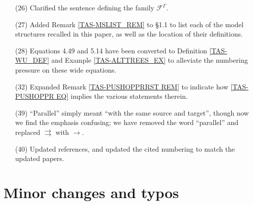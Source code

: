 \documentclass[a4paper,10pt
]{article}%
\numberwithin{equation}{section}
\numberwithin{figure}{section}
\theoremstyle{definition} %
\newcommand{\1}{\ensuremath{\mathbbm 1}}%
\begin{document}
\begin{enumerate}
\item[(26)] Clarified the sentence defining the family $\mathcal F^\Gamma$.
\item[(27)] Added Remark \ref{TAS-MSLIST_REM} to \S 1.1 to list each of the model structures recalled in this paper, as well as the location of their definitions.
\item[(28)] Equations 4.49 and 5.14 have been converted to Definition \ref{TAS-WU_DEF} and Example \ref{TAS-ALTTREES_EX} to alleviate the numbering pressure on these wide equations.
\item[(32)] Expanded Remark \ref{TAS-PUSHOPPRRST REM} to indicate how \eqref{TAS-PUSHOPPR EQ} implies the various statements therein.
\item[(39)] ``Parallel'' simply meant ``with the same source and target'', though now we find the emphasis confusing; we have removed the word ``parallel'' and replaced $\rightrightarrows$ with $\to$.         
\item[(40)] Updated references, and updated the cited numbering to match the updated papers.
\end{enumerate}



\section{Minor changes and typos}
 
\end{document}
